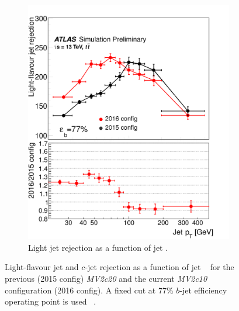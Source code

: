 \begin{figure}[h!]
\begin{subfigure}[b]{0.4\textwidth}
        \includegraphics[width=\textwidth]{figures/object/light_rej_pt}
        \caption{Light jet rejection as a function of jet \pt.}
        \label{fig:obj_light_rej}
    \end{subfigure}
\caption{Light-flavour jet and $c$-jet rejection as a function of jet \pt~ for the previous (2015 config) \emph{MV2c20} and the current \emph{MV2c10} configuration (2016 config). A fixed cut at 77\% $b$-jet efficiency operating point is used ~\cite{btaggingRun2}.}
\label{fig:obj_btag_rej}
\end{figure}


